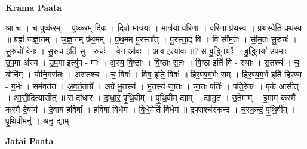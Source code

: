 \documentclass[17pt]{extarticle}
\begin{document}
\textbf{Krama Paata} \newline

आ च॑ । च॒ पुष्क॑रम् । पुष्क॑रम् दि॒वः । दि॒वो मात्र॑या । मात्र॑या वरि॒णा । व॒रि॒णा प्र॑थस्व । प्र॒थ॒स्वेति॑ प्रथस्व ॥ ब्रह्म॑ जज्ञा॒नम् । ज॒ज्ञा॒नम् प्र॑थ॒मम् । प्र॒थ॒मम् पु॒रस्ता᳚त् । पु॒रस्ता॒द् वि । वि सी॑म॒तः । सी॒म॒तः सु॒रुचः॑ । सु॒रुचो॑ वे॒नः । सु॒रुच॒ इति॑ सु - रुचः॑ । वे॒न आ॑वः । आ॒व॒ इत्या॑वः ॥? स बु॒द्ध्नियाः᳚ । बु॒द्ध्निया॑ उप॒माः । उ॒प॒मा अ॑स्य । उ॒प॒मा इत्यु॑प - माः । अ॒स्य॒ वि॒ष्ठाः । वि॒ष्ठाः स॒तः । वि॒ष्ठा इति॑ वि - स्थाः । स॒तश्च॑ । च॒ योनि᳚म् । योनि॒मस॑तः । अस॑तश्च । च॒ विवः॑ । विव॒ इति॒ विवः॑ ॥ हि॒र॒ण्य॒ग॒र्भः सम् । हि॒र॒ण्य॒ग॒र्भ इति॑ हिरण्य - ग॒र्भः । सम॑वर्तत । अ॒व॒र्त॒ताग्रे᳚ । अग्रे॑ भू॒तस्य॑ । भू॒तस्य॑ जा॒तः । जा॒तः पतिः॑ । पति॒रेकः॑ । एक॑ आसीत् । आ॒सी॒दित्या॑सीत् ॥ स दा॑धार । दा॒धा॒र॒ पृ॒थि॒वीम् । पृ॒थि॒वीम् द्याम् । द्यामु॒त । उ॒तेमाम् । इ॒माम् कस्मै᳚ । कस्मै॑ दे॒वाय॑ । दे॒वाय॑ ह॒विषा᳚ । ह॒विषा॑ विधेम । वि॒धे॒मेति॑ विधेम ॥ द्र॒फ्सश्च॑स्कन्द । च॒स्क॒न्द॒ पृ॒थि॒वीम् । पृ॒थि॒वीमनु॑ । अनु॒ द्याम् \newline

\textbf{Jatai Paata} \newline
\end{document}
